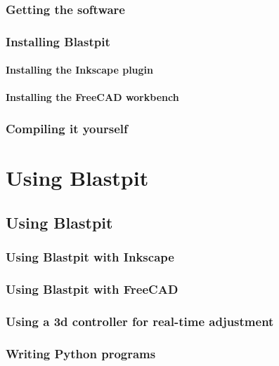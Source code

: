 \documentclass[12pt,fleqn]{book} %
\begin{document}
\section{Getting the software}

\section{Installing Blastpit}

\subsection{Installing the Inkscape plugin}

\subsection{Installing the FreeCAD workbench}

\section{Compiling it yourself}

%

\part{Using Blastpit}

\chapter{Using Blastpit}

\section{Using Blastpit with Inkscape}

\section{Using Blastpit with FreeCAD}

\section{Using a 3d controller for real-time adjustment}

\section{Writing Python programs}
\end{document}
